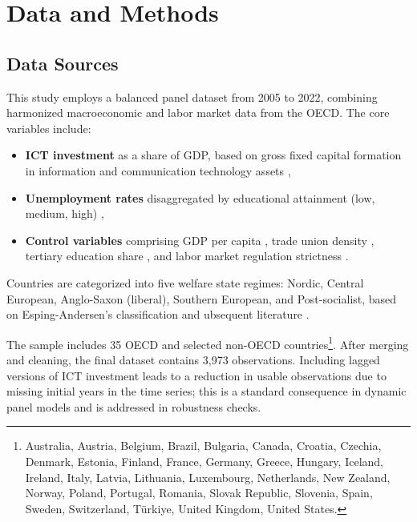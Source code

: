 
\section{Data and Methods}

\subsection{Data Sources}

This study employs a balanced panel dataset from 2005 to 2022, combining harmonized macroeconomic and 
labor market data from the OECD. The core variables include:

\begin{itemize}
  \item \textbf{ICT investment} as a share of GDP, based on gross fixed capital formation in 
  information and communication technology assets \parencite{oecd2022ict},
  \item \textbf{Unemployment rates} disaggregated by educational attainment (low, medium, high) 
  \parencite{oecd2022unemployment},
  \item \textbf{Control variables} comprising GDP per capita \parencite{oecd2022gdp}, trade union 
  density \parencite{oecd2022tud}, tertiary education share \parencite{oecd2022education}, and labor 
  market regulation strictness \parencite{oecd2022regulation}.
\end{itemize}

Countries are categorized into five welfare state regimes: Nordic, Central European, Anglo-Saxon 
(liberal), Southern European, and Post-socialist, based on Esping-Andersen’s classification and 
ubsequent literature \parencite{espingandersen1990thethree, ferrera1996thesouthern}.

The sample includes 35 OECD and selected non-OECD countries\footnote{Australia, Austria, Belgium, 
Brazil, Bulgaria, Canada, Croatia, Czechia, Denmark, Estonia, Finland, France, Germany, Greece, 
Hungary, Iceland, Ireland, Italy, Latvia, Lithuania, Luxembourg, Netherlands, New Zealand, Norway, 
Poland, Portugal, Romania, Slovak Republic, Slovenia, Spain, Sweden, Switzerland, Türkiye, United 
Kingdom, United States.}. After merging and cleaning, the final dataset contains 3,973 observations. 
Including lagged versions of ICT investment leads to a reduction in usable observations due to 
missing initial years in the time series; this is a standard consequence in dynamic panel models and 
is addressed in robustness checks.

